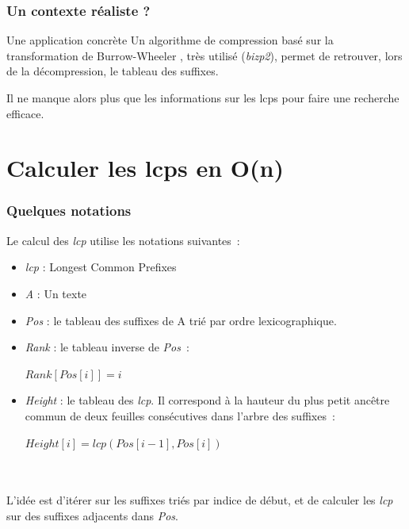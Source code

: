 \documentclass[10pt]{beamer}
\begin{document}
\begin{frame}
  \frametitle{Un contexte réaliste ?}
  
  \begin{block}{Une application concrète}
    Un algorithme de compression basé sur la transformation de
    Burrow-Wheeler \cite{Burrows94}, très utilisé (\emph{bizp2}), permet
    de retrouver, lors de la décompression, le tableau des suffixes. 
    
    Il ne manque alors plus que les informations sur les lcps pour faire
    une recherche efficace. 
  \end{block}

\end{frame}

\section{Calculer les lcps en O(n)}
\label{sec:algo}


\begin{frame}
  \frametitle{Quelques notations}

  Le calcul des \textit{lcp} utilise les notations suivantes~:
  \begin{itemize}
  \item \textit{lcp} : Longest Common Prefixes
  \item \textit{A} : Un texte
  \item \textit{Pos} : le tableau des suffixes de A trié par ordre
    lexicographique.
  \item \textit{Rank} : le tableau inverse de \textit{Pos}~:
    \begin{center}
    $\mathit{Rank}[\mathit{Pos}[i]] = i$
    \end{center}
  \item \textit{Height} : le tableau des \textit{lcp}. Il correspond à la
    hauteur du plus petit ancêtre commun de deux feuilles consécutives dans
    l'arbre des suffixes~:
    \begin{center}
    $\mathit{Height}[i] = \mathit{lcp}(\mathit{Pos}[i-1], \mathit{Pos}[i])$
    \end{center}
  \end{itemize}
  \hfill \\ \hfill \\

  L'idée est d'itérer sur les suffixes triés par indice de début, et de
  calculer les \textit{lcp} sur des suffixes adjacents dans \textit{Pos}.
\end{frame}
\end{document}

